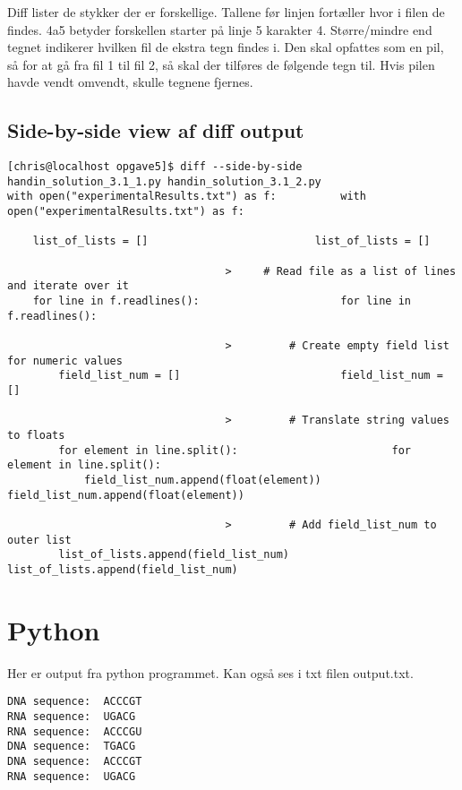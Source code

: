 \documentclass[12pt]{article}
\begin{document}
Diff lister de stykker der er forskellige. Tallene før linjen fortæller hvor i filen de findes. 4a5 betyder forskellen starter på linje 5 karakter 4. Større/mindre end tegnet indikerer hvilken fil de ekstra tegn findes i. Den skal opfattes som en pil, så for at gå fra fil 1 til fil 2, så skal der tilføres de følgende tegn til. Hvis pilen havde vendt omvendt, skulle tegnene fjernes.

\subsection{Side-by-side view af diff output}

\begin{lstlisting}
[chris@localhost opgave5]$ diff --side-by-side handin_solution_3.1_1.py handin_solution_3.1_2.py 
with open("experimentalResults.txt") as f:			with open("experimentalResults.txt") as f:

    list_of_lists = []						    list_of_lists = []

							      >	    # Read file as a list of lines and iterate over it
    for line in f.readlines():					    for line in f.readlines():

							      >	        # Create empty field list for numeric values
        field_list_num = []					        field_list_num = []

							      >	        # Translate string values to floats
        for element in line.split():				        for element in line.split():
            field_list_num.append(float(element))		            field_list_num.append(float(element))

							      >	        # Add field_list_num to outer list
        list_of_lists.append(field_list_num)			        list_of_lists.append(field_list_num)
\end{lstlisting}

\section{Python}

Her er output fra python programmet. Kan også ses i txt filen output.txt.

\begin{lstlisting}
DNA sequence:  ACCCGT 
RNA sequence:  UGACG 
RNA sequence:  ACCCGU 
DNA sequence:  TGACG 
DNA sequence:  ACCCGT 
RNA sequence:  UGACG 
\end{lstlisting}
\end{document}
